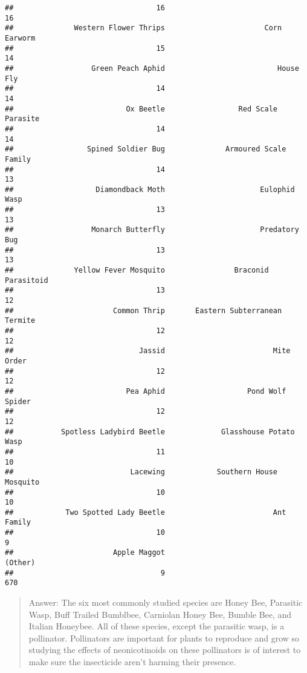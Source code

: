 \documentclass[]{article}
\begin{document}
\begin{verbatim}
##                                 16                                 16 
##              Western Flower Thrips                       Corn Earworm 
##                                 15                                 14 
##                  Green Peach Aphid                          House Fly 
##                                 14                                 14 
##                          Ox Beetle                 Red Scale Parasite 
##                                 14                                 14 
##                 Spined Soldier Bug              Armoured Scale Family 
##                                 14                                 13 
##                   Diamondback Moth                      Eulophid Wasp 
##                                 13                                 13 
##                  Monarch Butterfly                      Predatory Bug 
##                                 13                                 13 
##              Yellow Fever Mosquito                Braconid Parasitoid 
##                                 13                                 12 
##                       Common Thrip       Eastern Subterranean Termite 
##                                 12                                 12 
##                             Jassid                         Mite Order 
##                                 12                                 12 
##                          Pea Aphid                   Pond Wolf Spider 
##                                 12                                 12 
##           Spotless Ladybird Beetle             Glasshouse Potato Wasp 
##                                 11                                 10 
##                           Lacewing            Southern House Mosquito 
##                                 10                                 10 
##            Two Spotted Lady Beetle                         Ant Family 
##                                 10                                  9 
##                       Apple Maggot                            (Other) 
##                                  9                                670
\end{verbatim}

\begin{quote}
Answer: The six most commonly studied species are Honey Bee, Parasitic
Wasp, Buff Trailed Bumblbee, Carniolan Honey Bee, Bumble Bee, and
Italian Honeybee. All of these species, except the parasitic wasp, is a
pollinator. Pollinators are important for plants to reproduce and grow
so studying the effects of neonicotinoids on these pollinators is of
interest to make sure the insecticide aren't harming their presence.
\end{quote}
\end{document}
